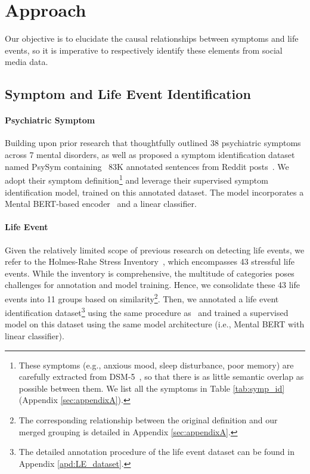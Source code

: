 \section{Approach}
\label{sec:approach}
Our objective is to elucidate the causal relationships between symptoms and life events, so it is imperative to respectively identify these elements from social media data.

\subsection{Symptom and Life Event Identification}
\label{sec:symp_iden}

\paragraph{Psychiatric Symptom}
Building upon prior research that thoughtfully outlined 38 psychiatric symptoms across 7 mental disorders, as well as proposed a symptom identification dataset named PsySym containing ~83K annotated sentences from Reddit posts~\cite{Zhang2022SymptomIF}.
We adopt their symptom definition\footnote{These symptoms (e.g., anxious mood, sleep disturbance, poor memory) are carefully extracted from DSM-5~\cite{american2013diagnostic}, so that there is as little semantic overlap as possible between them. 
We list all the symptoms in Table \ref{tab:symp_id} (Appendix \ref{sec:appendixA}).} and leverage their supervised symptom identification model, trained on this annotated dataset. The model incorporates a Mental BERT-based encoder~\cite{ji-etal-2022-mentalbert} and a linear classifier.
\paragraph{Life Event} 
Given the relatively limited scope of previous research on detecting life events, we refer to the Holmes-Rahe Stress Inventory~\cite{Noone2017stress}, which encompasses 43 stressful life events. While the inventory is comprehensive, the multitude of categories poses challenges for annotation and model training. Hence, we consolidate these 43 life events into 11 groups based on similarity\footnote{The corresponding relationship between the original definition and our merged grouping is detailed in Appendix \ref{sec:appendixA}.}. Then, we annotated a life event identification dataset\footnote{The detailed annotation procedure of the life event dataset can be found in Appendix \ref{apd:LE_dataset}.} using the same procedure as~\citet{Zhang2022SymptomIF} and trained a supervised model on this dataset using the same model architecture (i.e., Mental BERT with linear classifier).

